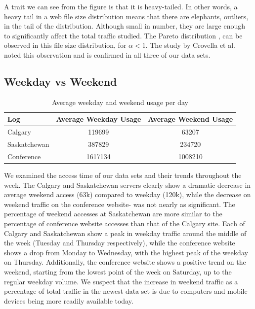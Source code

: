 \documentclass[10pt,conference]{IEEEtran}
\begin{document}
A trait we can see from the figure is that it is heavy-tailed. In other words, a heavy tail in a web file size distribution means that there are elephants, outliers, in the tail of the distribution. Although small in number, they are large enough to significantly affect the total traffic studied. The Pareto distribution \cite{Kotz}, can be observed in this file size distribution, for \begin{math} \alpha < 1\end{math}. The study by Crovella et al. \cite{Crovella} noted this observation and is confirmed in all three of our data sets.

\subsection{Weekday vs Weekend} %
\label{sub:weekday_vs_weekend}
\begin{table}[h]
    \caption{Average weekday and weekend usage per day}\label{tab:weeklyusage}
    \begin{tabular}{l | c c}
        Log & Average Weekday Usage & Average Weekend Usage\\
        \hline
        Calgary & 119699 & 63207\\
        Saskatchewan & 387829 & 234720\\
        Conference & 1617134 & 1008210
    \end{tabular}
\end{table}

We examined the access time of our data sets and their trends throughout the week. The Calgary and Saskatchewan servers clearly show a dramatic decrease in average weekend access (63k) compared to weekday (120k), while the decrease on weekend traffic on the conference website-  was not nearly as significant. The percentage of weekend accesses at Saskatchewan are more similar to the percentage of conference website accesses than that of the Calgary site. Each of Calgary and Saskatchewan show a peak in weekday traffic around the middle of the week (Tuesday and Thursday respectively), while the conference website shows a drop from Monday to Wednesday, with the highest peak of the weekday on Thursday. Additionally, the conference website shows a positive trend on the weekend, starting from the lowest point of the week on Saturday, up to the regular weekday volume. We suspect that the increase in weekend traffic as a percentage of total traffic in the newest data set is due to computers and mobile devices being more readily available today.
\end{document}
